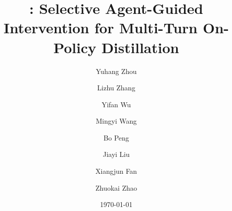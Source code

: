 \documentclass[]{fairmeta}
\title{\ours: Selective Agent-Guided Intervention for Multi-Turn On-Policy Distillation}
\author{Yuhang Zhou}
\author{Lizhu Zhang}
\author{Yifan Wu}
\author{Mingyi Wang}
\author{Bo Peng}
\author{Jiayi Liu}
\author{Xiangjun Fan}
\author{Zhuokai Zhao}
\affiliation{Meta AI}
\date{\today}
\theoremstyle{plain}
\theoremstyle{definition}
\theoremstyle{remark}
\begin{document}
\maketitle










\clearpage
\newpage



\clearpage
\newpage
\beginappendix

\end{document}
